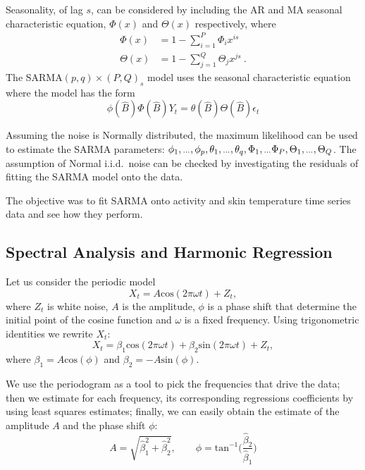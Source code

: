 \documentclass[]{article}
\newcommand{\dotdotdot}{\vphantom{.}_{\cdots}}
\newcommand{\backshift}{\widehat{B}}
\begin{document}
Seasonality, of lag $s$, can be considered by including the AR and MA seasonal characteristic equation, $\Phi(x)$ and $\Theta(x)$ respectively, where
\begin{align}
\Phi(x) &= 1 - \sum_{i=1}^P \Phi_i x^{is} \\
\Theta(x) &= 1 - \sum_{j=1}^Q \Theta_j x^{js} \ .
\end{align}
The SARMA$(p,q)\times(P,Q)_s$ model uses the seasonal characteristic equation where the model has the form
\begin{equation}
\phi\left(\backshift\right)\Phi\left(\backshift\right)Y_t
=
\theta\left(\backshift\right)\Theta\left(\backshift\right)\epsilon_t
\end{equation}

Assuming the noise is Normally distributed, the maximum likelihood can be used to estimate the SARMA parameters: $\phi_1,\dotdotdot,\phi_p,\theta_1,\dotdotdot,\theta_q,\Phi_1,\dotdotdot\Phi_P,\Theta_1,\dotdotdot,\Theta_Q$. The assumption of Normal i.i.d.~noise can be checked by investigating the residuals of fitting the SARMA model onto the data.

The objective was to fit SARMA onto activity and skin temperature time series data and see how they perform.

\subsection{Spectral Analysis and Harmonic Regression}
Let us consider the periodic model
\begin{equation*}
X_t = A\text{cos}(2\pi\omega t) + Z_t,
\end{equation*} 
where $Z_t$ is white noise, $A$ is the amplitude, $\phi$ is a phase shift that determine the initial point of the cosine function and $\omega$ is a fixed frequency. 
Using trigonometric identities we rewrite $X_t$:
\begin{equation}
X_t = \beta_1\text{cos}(2\pi\omega t) + \beta_2\text{sin}(2\pi\omega t) + Z_t,
\end{equation}
where $\beta_1 = A\text{cos}(\phi)$ and $\beta_2 = -A\text{sin}(\phi)$.

We use the periodogram as a tool to pick the frequencies that drive the data; then we estimate for each frequency, its corresponding regressions coefficients by using least squares estimates; finally, we can easily obtain the estimate of the amplitude $ A$ and the phase shift $\phi$:
\begin{equation}
A = \sqrt{\hat{\beta}_1^2 + \hat{\beta}_2^2}, \qquad \phi = \text{tan}^{-1}\Big(\frac{\hat{\beta}_2}{\hat{\beta}_1}\Big)
\end{equation}
\end{document}
